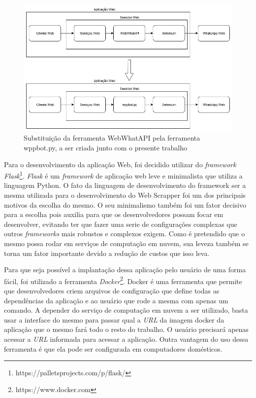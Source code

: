 \begin{figure}[h!]
    \includegraphics[width=\textwidth]{img/withWebWhatAPI.png}
    \caption{Substituição da ferramenta WebWhatAPI pela ferramenta wppbot.py, a ser criada junto com o presente trabalho}
    \centering
    \label{fig:webWhatAPIChange}
\end{figure}

Para o desenvolvimento da aplicação Web, foi decidido utilizar do \textit{framework} \textit{Flask}\footnote{https://palletsprojects.com/p/flask/}. \textit{Flask} é um \textit{framework} de aplicação web leve e minimalista que utiliza a linguagem Python. O fato da linguagem de desenvolvimento do framework ser a mesma utilizada para o desenvolvimento do Web Scrapper foi um dos principais motivos da escolha do mesmo. O seu minimalismo também foi um fator decisivo para a escolha pois auxilia para que os desenvolvedores possam focar em desenvolver, evitando ter que fazer uma serie de configurações complexas que outros \textit{frameworks} mais robustos e complexos exigem. Como é pretendido que o mesmo possa rodar em serviços de computação em nuvem, sua leveza também se torna um fator importante devido a redução de custos que isso leva.

Para que seja possível a implantação dessa aplicação pelo usuário de uma forma fácil, foi utilizado a ferramenta \textit{Docker}\footnote{https://www.docker.com}. Docker é uma ferramenta que permite que desenvolvedores criem arquivos de configuração que define todas as dependências da aplicação e ao usuário que rode a mesma com apenas um comando. A depender do serviço de computação em nuvem a ser utilizado, basta usar a interface do mesmo para passar qual a \textit{URL} da imagem docker da aplicação que o mesmo fará todo o resto do trabalho. O usuário precisará apenas acessar a \textit{URL} informada para acessar a aplicação. Outra vantagem do uso dessa ferramenta é que ela pode ser configurada em computadores domésticos.



